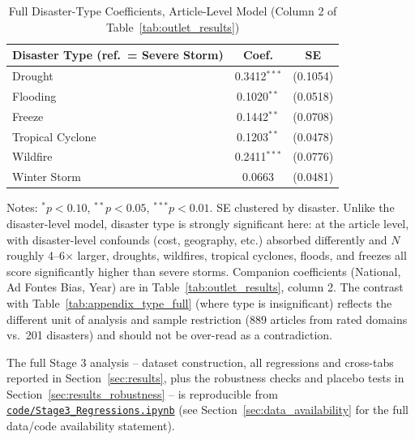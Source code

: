 \documentclass[12pt]{article}
\begin{document}
\begin{table}[ht]
\centering
\caption{Full Disaster-Type Coefficients, Article-Level Model (Column 2 of Table~\ref{tab:outlet_results})}
\label{tab:appendix_article_full}
\begin{threeparttable}
\begin{tabular}{lcc}
\toprule
Disaster Type (ref.\ = Severe Storm) & Coef. & SE \\
\midrule
Drought          & 0.3412$^{***}$ & (0.1054) \\
Flooding         & 0.1020$^{**}$  & (0.0518) \\
Freeze           & 0.1442$^{**}$  & (0.0708) \\
Tropical Cyclone & 0.1203$^{**}$  & (0.0478) \\
Wildfire         & 0.2411$^{***}$ & (0.0776) \\
Winter Storm     & 0.0663         & (0.0481) \\
\bottomrule
\end{tabular}
\begin{tablenotes}
\small
\item Notes: $^{*}p<0.10$, $^{**}p<0.05$, $^{***}p<0.01$. SE clustered by
disaster. Unlike the disaster-level model, disaster type is strongly
significant here: at the article level, with disaster-level confounds
(cost, geography, etc.) absorbed differently and $N$ roughly 4--6$\times$
larger, droughts, wildfires, tropical cyclones, floods, and freezes all
score significantly higher than severe storms. Companion coefficients
(National, Ad Fontes Bias, Year) are in Table~\ref{tab:outlet_results},
column 2. The contrast with Table~\ref{tab:appendix_type_full} (where type
is insignificant) reflects the different unit of analysis and sample
restriction (889 articles from rated domains vs.\ 201 disasters) and
should not be over-read as a contradiction.
\end{tablenotes}
\end{threeparttable}
\end{table}

The full Stage 3 analysis -- dataset construction, all regressions and
cross-tabs reported in Section~\ref{sec:results}, plus the robustness
checks and placebo tests in Section~\ref{sec:results_robustness} -- is
reproducible from
\href{https://github.com/Hariaksha/climate-disaster/blob/main/code/Stage3_Regressions.ipynb}{\texttt{code/Stage3\_Regressions.ipynb}}
(see Section~\ref{sec:data_availability} for the full data/code
availability statement).
\end{document}
